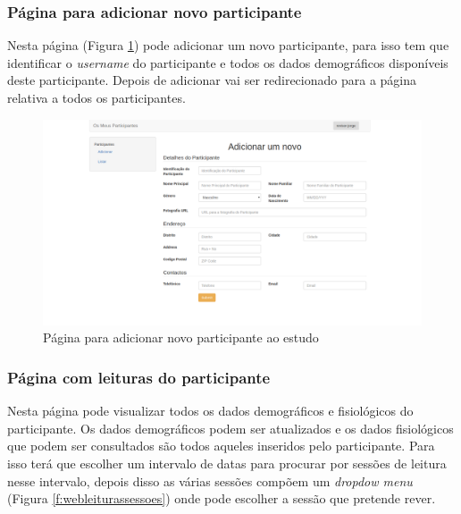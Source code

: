 \subsubsection{Página para adicionar novo participante}
Nesta página (Figura \ref{f:web-newparticipante}) pode adicionar um novo participante, para isso tem que identificar o \textit{username} do participante e todos os dados demográficos disponíveis deste participante. Depois de adicionar vai ser redirecionado para a página relativa a todos os participantes. 

\begin{figure}[H]
\centering
\includegraphics[width=1\textwidth]{imgs/add_participant_web.png}
\caption[Página para adicionar novo participante ao estudo]{Página para adicionar novo participante ao estudo}
\label{f:web-newparticipante}
\end{figure}
\newpage
\subsubsection{Página com leituras do participante}
Nesta página pode visualizar todos os dados demográficos e fisiológicos do participante. Os dados demográficos podem ser atualizados e os dados fisiológicos que podem ser consultados são todos aqueles inseridos pelo participante. Para isso terá que escolher um intervalo de datas para procurar por sessões de leitura nesse intervalo, depois disso as várias sessões compõem um \textit{dropdow menu} (Figura \ref{f:webleiturassessoes}) onde pode escolher a sessão que pretende rever. 

